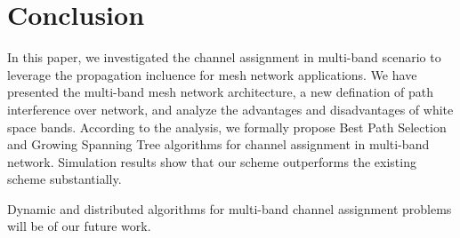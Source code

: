 \section{Conclusion}
\label{sec:conclusion}
In this paper, we investigated the channel assignment in multi-band scenario to leverage the propagation incluence for mesh network applications. 
We have presented the multi-band mesh network architecture, a new defination of path interference over network, and analyze the advantages and disadvantages of white space bands.
According to the analysis, we formally propose Best Path Selection and Growing Spanning Tree algorithms for channel assignment in multi-band network. Simulation results show that our scheme outperforms the existing scheme substantially.

Dynamic and distributed algorithms for multi-band channel assignment problems will be of our future work.

